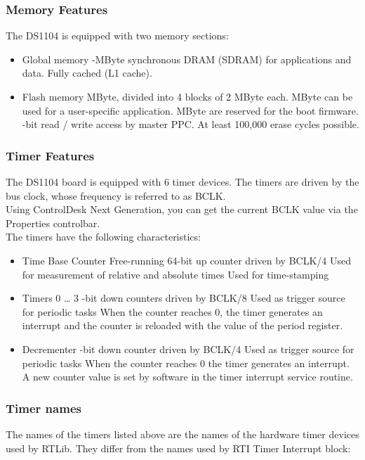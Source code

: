 \subsubsection{Memory Features}
The DS1104 is equipped with two memory sections:
\begin{itemize}
    \item Global memory
    -MByte synchronous DRAM (SDRAM) for applications and data.
    \subitem Fully cached (L1 cache).
    \item Flash memory
     MByte, divided into 4 blocks of 2 MByte each.
     MByte can be used for a user-specific application.
     MByte are reserved for the boot firmware.
    -bit read / write access by master PPC.
    \subitem At least 100,000 erase cycles possible.
\end{itemize}

\subsubsection{Timer Features}
The DS1104 board is equipped with 6 timer devices. The timers are driven by the bus clock, whose frequency is referred to as BCLK.\\
Using ControlDesk Next Generation, you can get the current BCLK value via the Properties controlbar.\\
The timers have the following characteristics:
\begin{itemize}
    \item Time Base Counter
    \subitem Free-running 64-bit up counter driven by BCLK/4
    \subitem Used for measurement of relative and absolute times
    \subitem Used for time-stamping
    \item Timers 0 … 3
    -bit down counters driven by BCLK/8
    \subitem Used as trigger source for periodic tasks
    \subitem When the counter reaches 0, the timer generates an interrupt and the counter is reloaded with the value of the period register.
    \item Decrementer
    -bit down counter driven by BCLK/4
    \subitem Used as trigger source for periodic tasks
    \subitem When the counter reaches 0 the timer generates an interrupt. A new counter value is set by software in the timer interrupt service routine.
\end{itemize}

\subsubsection{Timer names}
The names of the timers listed above are the names of the hardware timer devices used by RTLib. They differ from the names used by RTI Timer Interrupt block:\\

